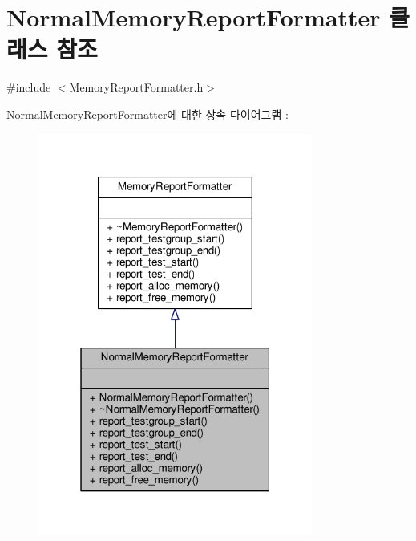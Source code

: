\hypertarget{class_normal_memory_report_formatter}{}\section{Normal\+Memory\+Report\+Formatter 클래스 참조}
\label{class_normal_memory_report_formatter}


{\ttfamily \#include $<$Memory\+Report\+Formatter.\+h$>$}



Normal\+Memory\+Report\+Formatter에 대한 상속 다이어그램 \+: 
\nopagebreak
\begin{figure}[H]
\begin{center}
\leavevmode
\includegraphics[width=256pt]{class_normal_memory_report_formatter__inherit__graph}
\end{center}
\end{figure}


